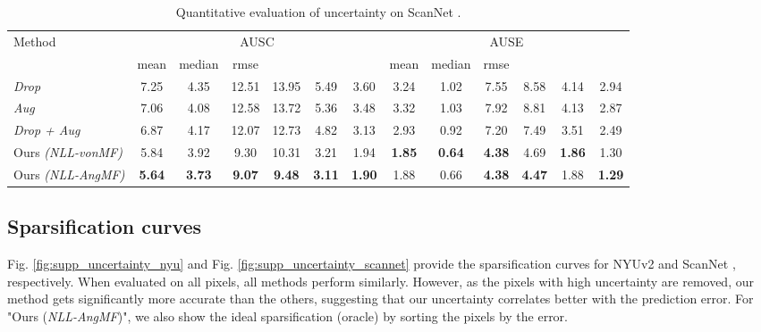 \documentclass[10pt,twocolumn,letterpaper]{article}
\begin{document}
\begin{table}[h]
\normalsize
\setlength\tabcolsep{1.5pt}
\begin{center}
\begin{tabular}{l|cccccc|cccccc}
\toprule
\multirow{2}{4em}{Method} & \multicolumn{6}{c|}{\small AUSC } &
\multicolumn{6}{c}{\small AUSE }\\
\cline{2-13}
& {\small mean} & {\small median} & {\small rmse} & {\footnotesize } & {\footnotesize } & {\footnotesize } & {\small mean} & {\small median} & {\small rmse} & {\footnotesize } & {\footnotesize } & {\footnotesize }\\
\midrule
\textit{Drop} 
& 7.25 & 4.35 & 12.51 & 13.95 & 5.49 & 3.60
& 3.24 & 1.02 & 7.55 & 8.58 & 4.14 & 2.94\\
\textit{Aug} 
& 7.06 & 4.08 & 12.58 & 13.72 & 5.36 & 3.48
& 3.32 & 1.03 & 7.92 & 8.81 & 4.13 & 2.87\\
\textit{Drop + Aug} 
& 6.87 & 4.17 & 12.07 & 12.73 & 4.82 & 3.13
& 2.93 & 0.92 & 7.20 & 7.49 & 3.51 & 2.49\\
\hline
Ours \textit{(NLL-vonMF)} 
& 5.84 & 3.92 & 9.30 & 10.31 & 3.21 & 1.94
& \textbf{1.85} & \textbf{0.64} & \textbf{4.38} & 4.69 & \textbf{1.86} & 1.30\\
Ours \textit{(NLL-AngMF)} 
& \textbf{5.64} & \textbf{3.73} & \textbf{9.07} & \textbf{9.48} & \textbf{3.11} & \textbf{1.90}
& 1.88 & 0.66 & \textbf{4.38} & \textbf{4.47} & 1.88 & \textbf{1.29}\\
\bottomrule
\end{tabular}
\end{center}
\caption{Quantitative evaluation of uncertainty on ScanNet \cite{ScanNet}.}
\label{table:supp_uncertainty-scannet}
\end{table}

\newpage
\subsection{Sparsification curves}

Fig. \ref{fig:supp_uncertainty_nyu} and Fig. \ref{fig:supp_uncertainty_scannet} provide the sparsification curves for NYUv2 \cite{NYUv2} and ScanNet \cite{ScanNet}, respectively. When evaluated on all pixels, all methods perform similarly. However, as the pixels with high uncertainty are removed, our method gets significantly more accurate than the others, suggesting that our uncertainty correlates better with the prediction error. For "Ours (\textit{NLL-AngMF})", we also show the ideal sparsification (oracle) by sorting the pixels by the error.
\end{document}
